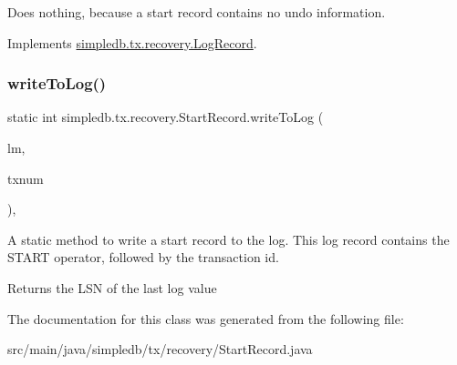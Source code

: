 Does nothing, because a start record contains no undo information. 

Implements \hyperlink{interfacesimpledb_1_1tx_1_1recovery_1_1LogRecord_a1f1949e7f3746b9b8b3bc985c89214e5}{simpledb.\+tx.\+recovery.\+Log\+Record}.

\mbox{\label{classsimpledb_1_1tx_1_1recovery_1_1StartRecord_a11435145a96d9cc068a0c80cb3131d63}} 
\subsubsection{\texorpdfstring{write\+To\+Log()}{writeToLog()}}
{\footnotesize\ttfamily static int simpledb.\+tx.\+recovery.\+Start\+Record.\+write\+To\+Log (\begin{DoxyParamCaption}\item[{\hyperlink{classsimpledb_1_1log_1_1LogMgr}{Log\+Mgr}}]{lm,  }\item[{int}]{txnum }\end{DoxyParamCaption})\hspace{0.3cm}{\ttfamily [inline]}, {\ttfamily [static]}}

A static method to write a start record to the log. This log record contains the S\+T\+A\+RT operator, followed by the transaction id. \begin{DoxyReturn}{Returns}
the L\+SN of the last log value 
\end{DoxyReturn}


The documentation for this class was generated from the following file\+:\begin{DoxyCompactItemize}
\item 
src/main/java/simpledb/tx/recovery/Start\+Record.\+java\end{DoxyCompactItemize}
